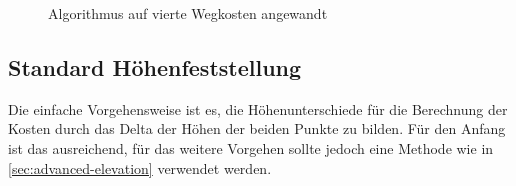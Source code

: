 \begin{figure}[H]
	\centering
	\caption{Algorithmus auf vierte Wegkosten angewandt
		\label{fig:vierte-algorithmus}}
\end{figure}









\subsection{Standard Höhenfeststellung}
\label{sec:standard-elevation}
Die einfache Vorgehensweise ist es, die Höhenunterschiede für die Berechnung der Kosten durch das Delta der Höhen der beiden Punkte zu bilden. Für den Anfang ist das ausreichend, für das weitere Vorgehen sollte jedoch eine Methode wie in \cref{sec:advanced-elevation} verwendet werden.

